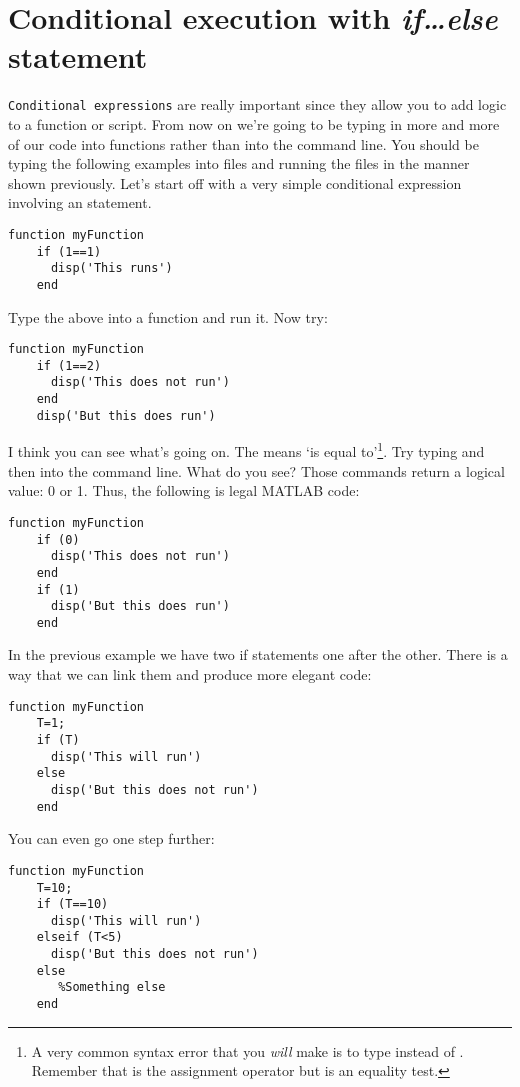 \documentclass{article}
\begin{document}
\section{Conditional execution with \emph{if\dots else} statement}

\verb|Conditional expressions| are really important since they allow you to add logic to a function or script. From now on we're going to be typing in more and more of our code into functions rather than into the command line. You should be typing the following examples into files and running the files in the manner shown previously. Let's start off with a very simple conditional expression involving an  statement. 

\begin{lstlisting}
function myFunction
	if (1==1)
	  disp('This runs')
	end
\end{lstlisting}

Type the above into a function and run it. Now try:
\begin{lstlisting}
function myFunction
	if (1==2)
	  disp('This does not run')
	end
	disp('But this does run')
\end{lstlisting}

I think you can see what's going on. The \mcode{==} means `is equal to'\footnote{A very common syntax error that you \textit{will} make is to type  instead of . Remember that \mcode{=} is the assignment operator but \mcode{==} is an equality test. 
}. Try typing  and then  into the command line. What do you see? Those commands return a logical value: 0 or 1. Thus, the following is legal MATLAB code:
\begin{lstlisting}
function myFunction
	if (0)
	  disp('This does not run')
	end
	if (1)
	  disp('But this does run')
    end
\end{lstlisting}

In the previous example we have two if statements one after the other. There is a way that we can link them and produce more elegant code:
\begin{lstlisting}
function myFunction
    T=1;
	if (T)
	  disp('This will run')
	else
	  disp('But this does not run')
    end
\end{lstlisting}

You can even go one step further:

\begin{lstlisting}
function myFunction
    T=10;
	if (T==10)
	  disp('This will run')
	elseif (T<5)
	  disp('But this does not run')
    else
       %Something else
    end
\end{lstlisting}
\end{document}
